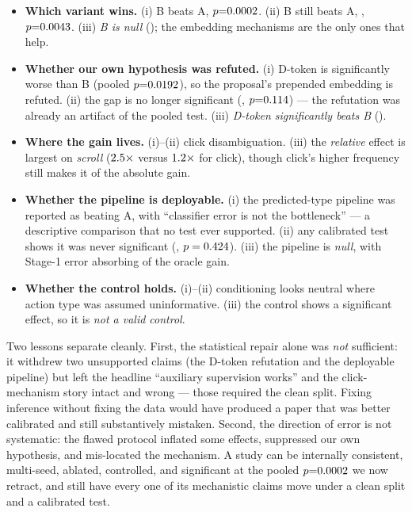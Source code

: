 \begin{itemize}
\item \textbf{Which variant wins.} (i) B beats A, $p{=}0.0002$.
(ii) B still beats A, \ExpBvsA{}, $p{=}0.0043$. (iii) \emph{B is null}
(\ConfBvsA{}); the embedding mechanisms are the only ones that help.
\item \textbf{Whether our own hypothesis was refuted.} (i) D-token is
significantly worse than B (pooled $p{=}0.0192$), so the proposal's
prepended embedding is refuted. (ii) the gap is no longer significant
(\ExpDtvsB{}, $p{=}0.114$) --- the refutation was already an artifact
of the pooled test. (iii) \emph{D-token significantly beats B}
(\ConfDtvsB{}).
\item \textbf{Where the gain lives.} (i)--(ii) click disambiguation.
(iii) the \emph{relative} effect is largest on \emph{scroll}
($2.5\times$ versus $1.2\times$ for click), though
click's higher frequency still makes it \ConfClickAbsShare{} of the
absolute gain.
\item \textbf{Whether the pipeline is deployable.} (i) the predicted-type
pipeline was reported as beating A, with ``classifier error is not the
bottleneck'' --- a descriptive comparison that no test ever supported.
(ii) any calibrated test shows it was never significant
(\ExpEtoEPredvsA{}, $p=0.424$). (iii) the
pipeline is \emph{null}, with Stage-1 error absorbing \ConfEtoEGapShare{}
of the oracle gain.
\item \textbf{Whether the control holds.} (i)--(ii) conditioning looks
neutral where action type was assumed uninformative. (iii) the control
shows a significant effect, so it is \emph{not a valid control}.
\end{itemize}

Two lessons separate cleanly. First, the statistical repair alone was
\emph{not} sufficient: it withdrew two unsupported claims (the D-token
refutation and the deployable pipeline) but left the headline ``auxiliary
supervision works'' and the click-mechanism story intact and wrong ---
those required the clean split. Fixing inference without fixing the data would have
produced a paper that was better calibrated and still substantively
mistaken. Second, the direction of error is not systematic: the flawed
protocol inflated some effects, suppressed our own hypothesis, and
mis-located the mechanism. A study can be internally consistent,
multi-seed, ablated, controlled, and significant at the pooled
$p{=}0.0002{}$ we now retract, and still have every one of its
mechanistic claims move under a clean split and a calibrated test.

